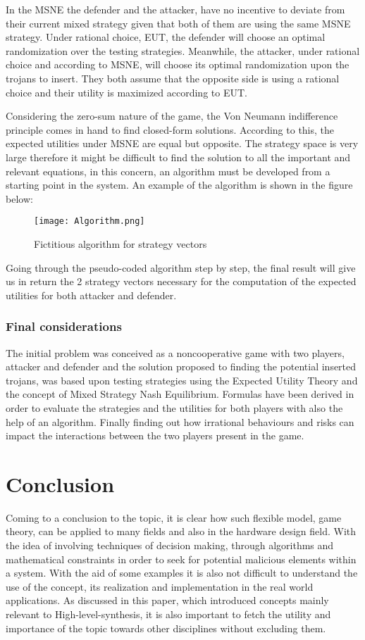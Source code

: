 \documentclass[conference]{IEEEtran}
\begin{document}
{{In the MSNE the defender and the attacker, have no incentive to deviate from their current mixed strategy given that both of them are using the same MSNE strategy. Under rational choice, EUT, the defender will choose an optimal randomization over the testing strategies. Meanwhile, the attacker, under rational choice and according to MSNE, will choose its optimal randomization upon the trojans to insert. They both assume that the opposite side is using a rational choice and their utility is maximized according to EUT.

Considering the zero-sum nature of the game, the Von Neumann indifference principle comes in hand to find closed-form solutions. According to this, the expected utilities under MSNE are equal but opposite. The strategy space is very large therefore it might be difficult to find the solution to all the important and relevant equations, in this concern, an algorithm must be developed from a starting point in the system. An example of the algorithm is shown in the figure below:
\begin{figure}[h]
    \centerline{\texttt{[image: Algorithm.png]}}
    \caption{Fictitious algorithm for strategy vectors}
    \label{algo}
\end{figure} 

Going through the pseudo-coded algorithm step by step, the final result will give us in return the 2 strategy vectors necessary for the computation of the expected utilities for both attacker and defender.

\subsubsection{Final considerations}
The initial problem was conceived as a noncooperative game with two players, attacker and defender and the solution proposed to finding the potential inserted trojans, was based upon testing strategies using the Expected Utility Theory and the concept of Mixed Strategy Nash Equilibrium.
Formulas have been derived in order to evaluate the strategies and the utilities for both players with also the help of an algorithm. Finally finding out how irrational behaviours and risks can impact the interactions between the two players present in the game.

\section{Conclusion}
Coming to a conclusion to the topic, it is clear how such flexible model, game theory, can be applied to many fields and also in the hardware design field. With the idea of involving techniques of decision making, through algorithms and mathematical constraints in order to seek for potential malicious elements within a system. With the aid of some examples it is also not difficult to understand the use of the concept, its realization and implementation in the real world applications. As discussed in this paper, which introduced concepts mainly relevant to High-level-synthesis, it is also important to fetch the utility and importance of the topic towards other disciplines without excluding them.



}}
\end{document}
